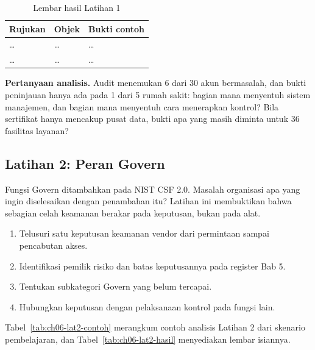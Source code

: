 \begin{table}[!htb]
  \centering\small
  \caption{Lembar hasil Latihan 1}\label{tab:ch06-lat1-hasil}
  \begin{tabularx}{\textwidth}{|>{\raggedright\arraybackslash}p{}|>{\raggedright\arraybackslash}X|>{\raggedright\arraybackslash}X|}
    \hline
    \textbf{Rujukan} & \textbf{Objek} & \textbf{Bukti contoh} \\ \hline
    \dots & \dots & \dots \\ \hline
    \dots & \dots & \dots \\ \hline
  \end{tabularx}
\end{table}

\textbf{Pertanyaan analisis.} Audit menemukan 6 dari 30 akun bermasalah, dan bukti peninjauan hanya
ada pada 1 dari 5 rumah sakit: bagian mana menyentuh sistem manajemen, dan bagian mana menyentuh cara
menerapkan kontrol? Bila sertifikat hanya mencakup pusat data, bukti apa yang masih diminta untuk 36
fasilitas layanan?

\subsection*{Latihan 2: Peran Govern}

Fungsi Govern ditambahkan pada NIST CSF 2.0. Masalah organisasi apa yang ingin diselesaikan dengan
penambahan itu? Latihan ini membuktikan bahwa sebagian celah keamanan berakar pada keputusan, bukan
pada alat.

\begin{enumerate}
  \item Telusuri satu keputusan keamanan vendor dari permintaan sampai pencabutan akses.
  \item Identifikasi pemilik risiko dan batas keputusannya pada register Bab 5.
  \item Tentukan subkategori Govern yang belum tercapai.
  \item Hubungkan keputusan dengan pelaksanaan kontrol pada fungsi lain.
\end{enumerate}

Tabel~\ref{tab:ch06-lat2-contoh} merangkum contoh analisis Latihan 2 dari skenario pembelajaran, dan
Tabel~\ref{tab:ch06-lat2-hasil} menyediakan lembar isiannya.

